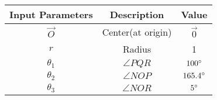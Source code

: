 \begin{tabular}{|c|c|c|}
    \hline
    \textbf{Input Parameters} &\textbf{Description} &\textbf{Value} \\
    \hline
     $\vec{O}$& Center(at origin)&$\vec{0}$\\
     \hline
 $r$ & Radius &1\\
 \hline
 $\theta_1$&$\angle PQR$&$100\degree$\\
 \hline
 $\theta_2$&$\angle NOP $&$165.4\degree$\\
 \hline
 $\theta_3$&$\angle NOR $&$5\degree$\\
 \hline
  \end{tabular}

